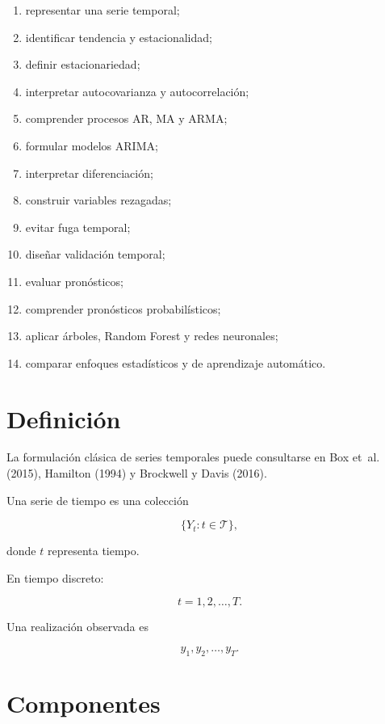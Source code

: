\documentclass[
  spanish,
  10.5pt,
  letterpaper,
  DIV=11,
  numbers=noendperiod,
  oneside,
  open=any]{scrreprt}
\providecommand{\tightlist}{%
  \setlength{\itemsep}{0pt}\setlength{\parskip}{0pt}}
\theoremstyle{definition}
\theoremstyle{definition}
\theoremstyle{plain}
\theoremstyle{remark}
\begin{document}
\begin{enumerate}
\def\labelenumi{\arabic{enumi}.}
\tightlist
\item
  representar una serie temporal;
\item
  identificar tendencia y estacionalidad;
\item
  definir estacionariedad;
\item
  interpretar autocovarianza y autocorrelación;
\item
  comprender procesos AR, MA y ARMA;
\item
  formular modelos ARIMA;
\item
  interpretar diferenciación;
\item
  construir variables rezagadas;
\item
  evitar fuga temporal;
\item
  diseñar validación temporal;
\item
  evaluar pronósticos;
\item
  comprender pronósticos probabilísticos;
\item
  aplicar árboles, Random Forest y redes neuronales;
\item
  comparar enfoques estadísticos y de aprendizaje automático.
\end{enumerate}

\section*{Definición}\label{definiciuxf3n}


La formulación clásica de series temporales puede consultarse en Box
et~al. (2015), Hamilton (1994) y Brockwell y Davis (2016).

Una serie de tiempo es una colección

\[
\{Y_t:t\in\mathcal{T}\},
\]

donde \(t\) representa tiempo.

En tiempo discreto:

\[
t=1,2,\ldots,T.
\]

Una realización observada es

\[
y_1,y_2,\ldots,y_T.
\]

\section*{Componentes}\label{componentes}
\end{document}
